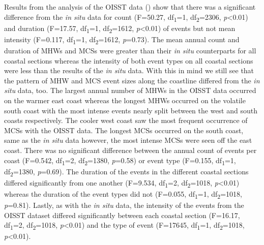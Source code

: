 \documentclass[a4paper,10pt,review]{elsarticle}
\begin{document}
Results from the analysis of the OISST data () show that there was a significant difference from the \emph{in situ} data for count (F=50.27, df\textsubscript{1}=1, df\textsubscript{2}=2306, \emph{p}<0.01) and duration (F=17.57, df\textsubscript{1}=1, df\textsubscript{2}=1612, \emph{p}<0.01) of events but not mean intensity (F=0.117, df\textsubscript{1}=1, df\textsubscript{2}=1612, \emph{p}=0.73). The mean annual count and duration of MHWs and MCSs were greater than their \emph{in situ} counterparts for all coastal sections whereas the intensity of both event types on all coastal sections were less than the results of the \emph{in situ} data. With this in mind we still see that the pattern of MHW and MCS event sizes along the coastline differed from the \emph{in situ} data, too. The largest annual number of MHWs in the OISST data occurred on the warmer east coast whereas the longest MHWs occurred on the volatile south coast with the most intense events nearly split between the west and south coasts respectively. The cooler west coast saw the most frequent occurrence of MCSs with the OISST data. The longest MCSs occurred on the south coast, same as the \emph{in situ} data however, the most intense MCSs were seen off the east coast. There was no significant difference between the annual count of events per coast (F=0.542, df\textsubscript{1}=2, df\textsubscript{2}=1380, \emph{p}=0.58) or event type (F=0.155, df\textsubscript{1}=1, df\textsubscript{2}=1380, \emph{p}=0.69). The duration of the events in the different coastal sections differed significantly from one another (F=9.534, df\textsubscript{1}=2, df\textsubscript{2}=1018, \emph{p}<0.01) whereas the duration of the event types did not (F=0.055, df\textsubscript{1}=1, df\textsubscript{2}=1018, \emph{p}=0.81). Lastly, as with the \emph{in situ} data, the intensity of the events from the OISST dataset differed significantly between each coastal section (F=16.17, df\textsubscript{1}=2, df\textsubscript{2}=1018, \emph{p}<0.01) and the type of event (F=17645, df\textsubscript{1}=1, df\textsubscript{2}=1018, \emph{p}<0.01).
\end{document}
